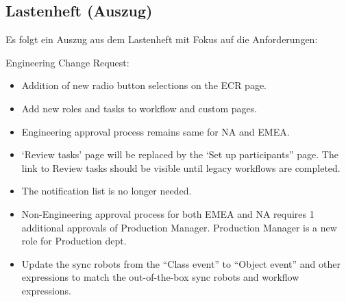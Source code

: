 \subsection{Lastenheft (Auszug)}
\label{app:Lastenheft}
Es folgt ein Auszug aus dem Lastenheft mit Fokus auf die Anforderungen:

Engineering Change Request:
\begin{itemize}
	\item Addition of new radio button selections on the ECR page.
	\item Add new roles and tasks to workflow and custom pages.
	\item Engineering approval process remains same for NA and EMEA.
	\item ‘Review tasks’ page will be replaced by the ‘Set up participants” page. The link to Review tasks should be visible until legacy workflows are completed.
	\item The notification list is no longer needed.
	\item Non-Engineering approval process for both EMEA and NA requires 1 additional approvals of Production Manager. Production Manager is a new role for Production dept.
	\item Update the sync robots from the “Class event” to “Object event” and other expressions to match the out-of-the-box sync robots and workflow expressions.
\end{itemize}

